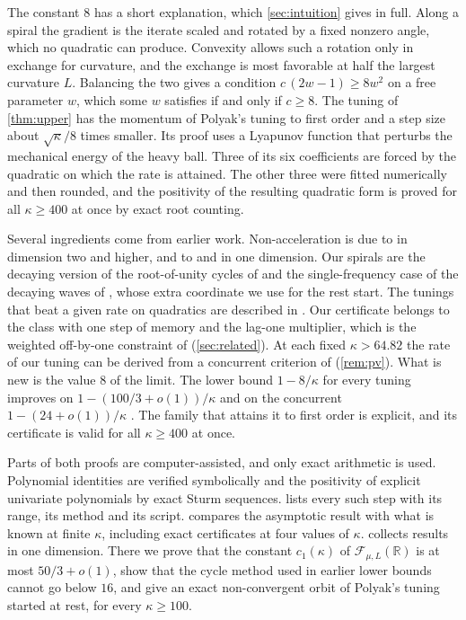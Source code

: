 \documentclass[11pt, a4paper]{article}
\theoremstyle{definition}
\newcommand{\R}{\mathbb{R}}
\newcommand{\F}{\mathcal{F}_{\mu,L}}
\begin{document}
The constant $8$ has a short explanation, which \cref{sec:intuition} gives in full. Along a spiral the gradient is the
iterate scaled and rotated by a fixed nonzero angle, which no quadratic can produce. Convexity allows such a rotation only in
exchange for curvature, and the exchange is most favorable at half the largest curvature $L$. Balancing the two gives a
condition $c\,(2w-1)\ge8w^2$ on a free parameter $w$, which some $w$ satisfies if and only if $c\ge8$. The tuning of
\cref{thm:upper} has the momentum of Polyak's tuning to first order and a step size about $\sqrt\kappa/8$ times smaller.
Its proof uses a Lyapunov function that perturbs the mechanical energy of the heavy ball. Three of its six coefficients
are forced by the quadratic on which the rate is attained. The other three were fitted numerically and then rounded, and
the positivity of the resulting quadratic form is proved for all $\kappa\ge400$ at once by exact root counting.

Several ingredients come from earlier work. Non-acceleration is due to \citet{goujaud2025provable} in dimension two and
higher, and to \citet{fotopoulos2026cycling} and \citet{liu2026sharp} in one dimension. Our spirals are the decaying
version of the root-of-unity cycles of \citet{goujaud2025provable} and the single-frequency case of the decaying waves of
\citet{pasechniuk2026two}, whose extra coordinate we use for the rest start. The tunings that beat
a given rate on quadratics are described in \citet[Lemma~2.4]{goujaud2025provable}. Our certificate belongs to the class
with one step of memory and the lag-one multiplier, which is the weighted off-by-one constraint of
\citet{lessard2016analysis} (\cref{sec:related}). At each fixed $\kappa>64.82$ the rate of our tuning can be derived from a
concurrent criterion of \citet[Thm.~7.2(b)]{pasechniuk2026two} (\cref{rem:pv}). What is new is the value $8$ of the
limit. The lower bound $1-8/\kappa$ for every tuning improves on $1-(100/3+o(1))/\kappa$ \citep{goujaud2025provable} and
on the concurrent $1-(24+o(1))/\kappa$ \citep{liu2026sharp}. The family that attains it to first order is explicit, and its certificate is
valid for all $\kappa\ge400$ at once.

Parts of both proofs are computer-assisted, and only exact arithmetic is used. Polynomial identities are verified
symbolically and the positivity of explicit univariate polynomials by exact Sturm sequences.  lists
every such step with its range, its method and its script.  compares the asymptotic result with what is
known at finite $\kappa$, including exact certificates at four values of $\kappa$.  collects results in
one dimension. There we prove that the constant $c_1(\kappa)$ of $\F(\R)$ is at most $50/3+o(1)$, show that the cycle
method used in earlier lower bounds cannot go below $16$, and give an exact non-convergent orbit of Polyak's tuning
started at rest, for every $\kappa\ge100$.
\end{document}
